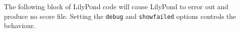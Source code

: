 \documentclass{scrartcl}
\begin{document}
The following block of LilyPond code will cause LilyPond to error out and
produce no score file.  Setting the \texttt{debug} and \texttt{showfailed}
options controls the behaviour.

\end{document}
